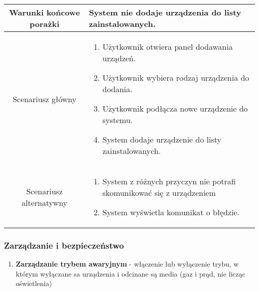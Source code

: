 \documentclass{article}
\begin{document}
\begin{enumerate}
\begin{enumerate}
\begin{table}[H]
\begin{tabular}{|c|p{7cm}|}
						\hline
						Warunki końcowe porażki & System nie dodaje urządzenia do listy zainstalowanych.                                                                                                                                                                                                      \\
						\hline
						Scenariusz główny       & \begin{enumerate}\item Użytkownik otwiera panel dodawania urządzeń.

\item Użytkownik wybiera rodzaj urządzenia do dodania.

\item Użytkownik podłącza nowe urządzenie do systemu.

\item System dodaje urządzenie do listy zainstalowanych.\end{enumerate} \\
						\hline
						Scenariusz alternatywny & \begin{enumerate}\item System z różnych przyczyn nie potrafi skomunikować się z urządzeniem

\item System wyświetla komunikat o błędzie.\end{enumerate}                                                                                                     \\
						\hline
					\end{tabular}
				\end{table}
		\end{enumerate}

		\subsubsection{Zarządzanie i bezpieczeństwo}

		\begin{enumerate}
			\item \textbf{Zarządzanie trybem awaryjnym} - włączenie lub wyłączenie
				trybu, w którym wyłączane sa urządzenia i odcinane są media (gaz i prąd,
				nie licząc oświetlenia)


\end{enumerate}
\end{enumerate}
\end{document}
